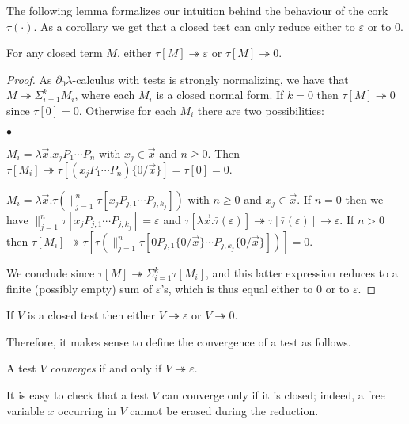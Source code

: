 \documentclass{LMCS}
\newcommand{\dzlam}{\ensuremath{\partial_0\lambda}}
\newcommand{\lam}{\ensuremath{\lambda}}
\newcommand{\msto}{\twoheadrightarrow}
\newcommand{\subst}[2]{\{ #2 / #1 \}}	\newcommand{\dg}[2]{\mathrm{deg}_{#1}(#2)} \newcommand{\obsle}{\sqsubseteq_{\mathcal{O}}}
\newcommand{\seq}[1]{\vec{#1}}
\newcommand{\gt}{\ensuremath{\tau}}
\newcommand{\gto}{\ensuremath{\bar\tau}}
\begin{document}
The following lemma formalizes our intuition behind the behaviour of the cork $\gt(\cdot)$.
As a corollary we get that a closed test can only reduce either to $\varepsilon$ or to 0.

\begin{lem}\label{lem:closed-go-to-eps-zero}
For any closed term $M$,  either $\gt[M]\msto\varepsilon$ or $\gt[M]\msto 0$.
\end{lem}

\begin{proof} As \dzlam-calculus with tests is strongly normalizing, 
we have that $M\msto \Sigma_{i = 1}^k M_i$,
where each $M_i$ is a closed  normal form. 
If $k =0$ then $\gt[M]\msto 0$ since $\gt[0] = 0$.
Otherwise for each $M_i$ there are two possibilities:
\begin{iteMize}{$\bullet$}
\item $M_i = \lam\seq x.x_j  P_1\cdots P_n$ with $x_j\in\seq x$ and $n\ge 0$.
	Then $\gt[M_i] \msto \gt[(x_j P_1\cdots P_n)\subst{\seq x}{0}] = \gt[0] = 0$.
\item $M_i = \lam \seq x.\gto(\parallel_{j=1}^n \gt[x_j P_{j,1}\cdots P_{j,k_j}])$ with $n\ge 0$ and $x_j\in\seq x$.
	If $n = 0$ then we have $\parallel_{j=1}^n \gt[x_j P_{j,1}\cdots P_{j,k_j}] = \varepsilon$ and 
	$\gt[\lam \seq x.\gto(\varepsilon)]\msto \gt[\gto(\varepsilon)]\to
	\varepsilon$.
	If $n > 0$ then $\gt[M_i]\msto \gt[\gto(\parallel_{j=1}^n \gt[0 P_{j,1}\subst{\seq x}{0}\cdots P_{j,k_j}\subst{\seq x}{0}])] = 0$.
\end{iteMize}
We conclude since $\gt[M]\msto \Sigma_{i = 1}^k \gt[M_i]$, and this latter 
expression reduces to a finite (possibly empty)  sum of $\varepsilon$'s, which is 
thus equal either to $0$ or to $\varepsilon$.
\end{proof}

\begin{cor}\label{cor:closed-tests-go-to-eps-zero}
If $V$ is a closed test then either $V\msto\varepsilon$ or $V\msto 0$. 
\end{cor}

Therefore, it makes sense to define the convergence of a test as follows.

\begin{defi}\label{def:convergence-no-promotion}
A test $V$ \emph{converges} if and only if $V \msto \varepsilon$.
\end{defi}

It is easy to check that a test $V$ can converge only if it is closed; 
indeed, a free variable $x$ occurring in $V$ cannot be erased during the reduction.
\end{document}
